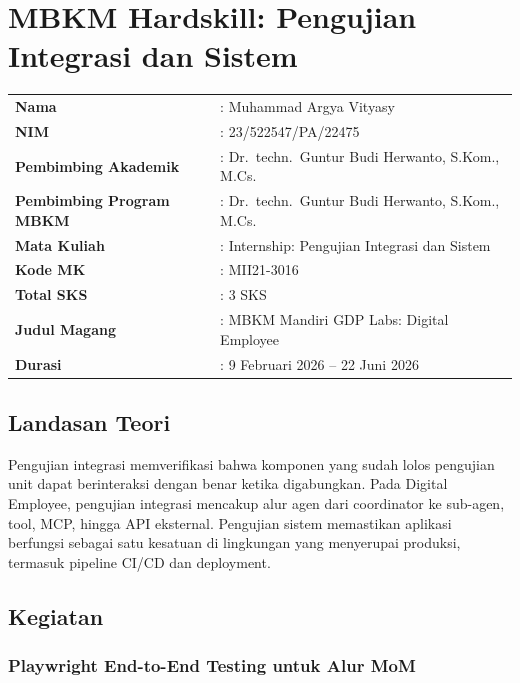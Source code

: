 \section{MBKM Hardskill: Pengujian Integrasi dan Sistem}

\begin{table}[H]
    \centering
    \begin{tabular}{ll}
        \textbf{Nama} & : Muhammad Argya Vityasy \\
        \textbf{NIM} & : 23/522547/PA/22475 \\
        \textbf{Pembimbing Akademik} & : Dr.\ techn.\ Guntur Budi Herwanto, S.Kom., M.Cs. \\
        \textbf{Pembimbing Program MBKM} & : Dr.\ techn.\ Guntur Budi Herwanto, S.Kom., M.Cs. \\
        \textbf{Mata Kuliah} & : Internship: Pengujian Integrasi dan Sistem \\
        \textbf{Kode MK} & : MII21-3016 \\
        \textbf{Total SKS} & : 3 SKS \\
        \textbf{Judul Magang} & : MBKM Mandiri GDP Labs: Digital Employee \\
        \textbf{Durasi} & : 9 Februari 2026 -- 22 Juni 2026 \\
    \end{tabular}
\end{table}

\subsection{Landasan Teori}

Pengujian integrasi memverifikasi bahwa komponen yang sudah lolos pengujian unit dapat berinteraksi dengan benar ketika digabungkan. Pada Digital Employee, pengujian integrasi mencakup alur agen dari coordinator ke sub-agen, tool, MCP, hingga API eksternal. Pengujian sistem memastikan aplikasi berfungsi sebagai satu kesatuan di lingkungan yang menyerupai produksi, termasuk pipeline CI/CD dan deployment.

\subsection{Kegiatan}

\subsubsection{Playwright End-to-End Testing untuk Alur MoM}

